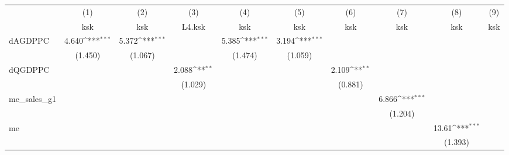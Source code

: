 {
\def\sym#1{\ifmmode^{#1}\else\(^{#1}\)\fi}
\begin{tabular}{l*{9}{c}}
\hline\hline
            &\multicolumn{1}{c}{(1)}&\multicolumn{1}{c}{(2)}&\multicolumn{1}{c}{(3)}&\multicolumn{1}{c}{(4)}&\multicolumn{1}{c}{(5)}&\multicolumn{1}{c}{(6)}&\multicolumn{1}{c}{(7)}&\multicolumn{1}{c}{(8)}&\multicolumn{1}{c}{(9)}\\
            &\multicolumn{1}{c}{ksk}&\multicolumn{1}{c}{ksk}&\multicolumn{1}{c}{L4.ksk}&\multicolumn{1}{c}{ksk}&\multicolumn{1}{c}{ksk}&\multicolumn{1}{c}{ksk}&\multicolumn{1}{c}{ksk}&\multicolumn{1}{c}{ksk}&\multicolumn{1}{c}{ksk}\\
\hline
dAGDPPC     &       4.640\sym{***}&       5.372\sym{***}&                     &       5.385\sym{***}&       3.194\sym{***}&                     &                     &                     &                     \\
            &     (1.450)         &     (1.067)         &                     &     (1.474)         &     (1.059)         &                     &                     &                     &                     \\
[1em]
dQGDPPC     &                     &                     &       2.088\sym{**} &                     &                     &       2.109\sym{**} &                     &                     &                     \\
            &                     &                     &     (1.029)         &                     &                     &     (0.881)         &                     &                     &                     \\
[1em]
me\_sales\_g1 &                     &                     &                     &                     &                     &                     &       6.866\sym{***}&                     &                     \\
            &                     &                     &                     &                     &                     &                     &     (1.204)         &                     &                     \\
[1em]
me          &                     &                     &                     &                     &                     &                     &                     &       13.61\sym{***}&                     \\
            &                     &                     &                     &                     &                     &                     &                     &     (1.393)         &                     \\

\end{tabular}}
